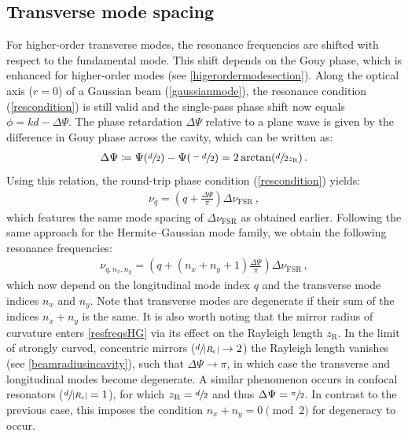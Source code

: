 \documentclass[../Thesis-IJspeert.tex]{subfiles}
\begin{document}
\subsection{Transverse mode spacing}
For higher-order transverse modes, the resonance frequencies are shifted with respect to the fundamental mode. This shift depends on the Gouy phase, which is enhanced for higher-order modes (see \autoref{higerordermodesection}). Along the optical axis ($r=0$) of a Gaussian beam (\autoref{gaussianmode}), the resonance condition (\autoref{rescondition}) is still valid and the single-pass phase shift now equals $\phi=kd-\Delta\Psi$. The phase retardation $\Delta\Psi$ relative to a plane wave is given by the difference in Gouy phase across the cavity, which can be written as:
\begin{align}
\label{deltapsi}
\Delta\Psi\coloneqq\Psi(\sfrac{d}{2})-\Psi(\sfrac{-d}{2})=2\arctan(\sfrac{d}{2z_\mathrm{R}})\,.
\end{align}
Using this relation, the round-trip phase condition (\autoref{rescondition}) yields:
\begin{align}
\label{resfreqsG}
\nu_q = \left(q + \frac{\Delta\Psi}{\pi} \right)\Delta\nu_\mathrm{FSR}\,,
\end{align}
which features the same mode spacing of $\Delta\nu_\mathrm{FSR}$ as obtained earlier. Following the same approach for the Hermite--Gaussian mode family, we obtain the following resonance frequencies:
\begin{align}
\label{resfreqsHG}
\nu_{q,n_x,n_y} = \left(q + \left(n_x+n_y+1\right)\frac{\Delta\Psi}{\pi} \right)\Delta\nu_\mathrm{FSR}\,,
\end{align}
which now depend on the longitudinal mode index $q$ and the transverse mode indices $n_x$ and $n_y$. Note that transverse modes are degenerate if their sum of the indices $n_x+n_y$ is the same. It is also worth noting that the mirror radius of curvature enters \autoref{resfreqsHG} via its effect on the Rayleigh length $z_\mathrm{R}$. In the limit of strongly curved, concentric mirrors ($\sfrac{d}{\lvert R_\mathrm{c} \rvert}\rightarrow 2$) the Rayleigh length vanishes (see \autoref{beamradiusincavity}), such that $\Delta\Psi\rightarrow\pi$, in which case the transverse and longitudinal modes become degenerate. A similar phenomenon occurs in confocal resonators ($\sfrac{d}{\lvert R_\mathrm{c} \rvert}= 1$), for which $z_\mathrm{R}=\sfrac{d}{2}$ and thus $\Delta\Psi=\sfrac{\pi}{2}$. In contrast to the previous case, this imposes the condition $n_x+n_y = 0 \pmod 2$ for degeneracy to occur.
\end{document}
